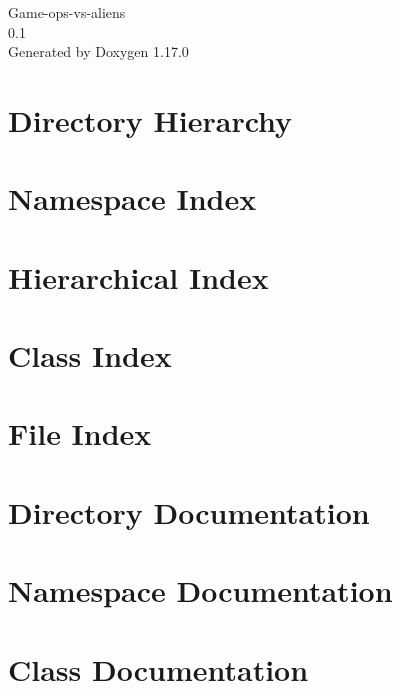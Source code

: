 \documentclass[twoside]{book}
\newcommand{\+}{\discretionary{\mbox{\scriptsize$\hookleftarrow$}}{}{}}
\newcommand{\clearemptydoublepage}{%
    \newpage{\pagestyle{empty}\cleardoublepage}%
  }
\begin{document}
  \raggedbottom
    \hypersetup{pageanchor=false,
                bookmarksnumbered=true,
                pdfencoding=unicode
               }
  \begin{titlepage}
  \vspace*{7cm}
  \begin{center}%
  {\Large Game-\/ops-\/vs-\/aliens}\\
  [1ex]\large 0.\+1 \\
  \vspace*{1cm}
  {\large Generated by Doxygen 1.17.0}\\
  \end{center}
  \end{titlepage}
  \clearemptydoublepage
  \tableofcontents
  \clearemptydoublepage
  \hypersetup{pageanchor=true}
\chapter{Directory Hierarchy}

\chapter{Namespace Index}

\chapter{Hierarchical Index}

\chapter{Class Index}

\chapter{File Index}

\chapter{Directory Documentation}

\chapter{Namespace Documentation}

\chapter{Class Documentation}



















\end{document}
